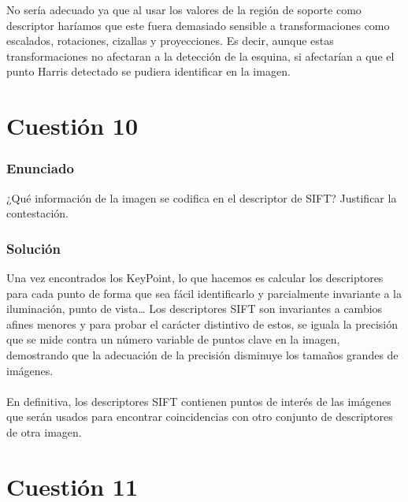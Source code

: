 No sería adecuado ya que al usar los valores de la región de soporte como descriptor haríamos que este fuera demasiado sensible a transformaciones como escalados, rotaciones, cizallas y proyecciones. Es decir, aunque estas transformaciones no afectaran a la detección de la esquina, si afectarían a que el punto Harris detectado se pudiera identificar en la imagen.


\section{Cuestión 10}

\subsubsection{Enunciado}

¿Qué información de la imagen se codifica en el descriptor de SIFT? Justificar la contestación. 

\subsubsection{Solución}

Una vez encontrados los KeyPoint, lo que hacemos es calcular los descriptores para cada punto de forma que sea fácil identificarlo y parcialmente invariante a la iluminación, punto de vista…
Los descriptores SIFT son invariantes a cambios afines menores y para probar el carácter distintivo de estos, se iguala la precisión que se mide contra un número variable de puntos clave en la imagen, demostrando que la adecuación de la precisión disminuye los tamaños grandes de imágenes.\\
\\
En definitiva, los descriptores SIFT contienen puntos de interés de las imágenes que serán usados para encontrar coincidencias con otro conjunto de descriptores de otra imagen.


\section{Cuestión 11}

